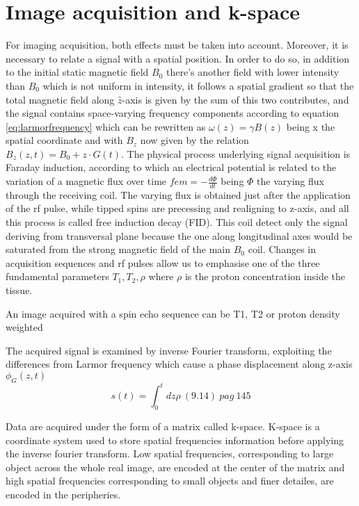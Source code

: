 \documentclass[11pt]{report}
\begin{document}
\section{Image acquisition and k-space}
For imaging acquisition, both effects must be taken into account. Moreover, it is necessary to relate a signal with a spatial position.
In order to do so, in addition to the initial static magnetic field $B_0$ there's another field with lower intensity than $B_0$ which is not uniform in intensity, it follows a spatial gradient so that the total magnetic field along $\hat z$-axis is given by the sum of this two contributes, and the signal contains space-varying frequency components according to equation \ref{eq:larmorfrequency} which can be rewritten as $\omega(z) = \gamma B(z)$ being x the spatial coordinate and with $B_z$ now given by the relation $B_z(z, t) = B_0 + z\cdot G(t)$.
The physical process underlying signal acquisition is Faraday induction, according to which an electrical potential is related to the variation of a magnetic flux over time $fem = -\frac{d\Phi}{dt}$ being $\Phi$ the varying flux through the receiving coil.
The varying flux is obtained just after the application of the rf pulse, while tipped spins are precessing and realigning to z-axis, and all this process is called free induction decay (FID). This coil detect only the signal deriving from transversal plane because the one along longitudinal axes would be saturated from the strong magnetic field of the main $B_0$ coil. Changes in acquisition sequences and rf pulses allow us to emphasise one of the three fundamental parameters $T_1, T_2, \rho$ where $\rho$ is the proton concentration inside the tissue.

An image acquired with a spin echo sequence can be T1, T2 or proton density weighted

The acquired signal is examined by inverse Fourier transform, exploiting the differences from Larmor frequency which cause a phase displacement along z-axis $\phi_G(z, t)$
\begin{equation}
s(t) = \int_0^tdz\rho \ (9.14) \ pag \ 145
\end{equation}

Data are acquired under the form of a matrix called k-space.
K-space is a coordinate system used to store spatial frequencies information before applying the inverse fourier transform.
Low spatial frequencies, corresponding to large object across the whole real image, are encoded at the center of the matrix and high spatial frequencies corresponding to small objects and finer detailes, are encoded in the peripheries.
\end{document}
